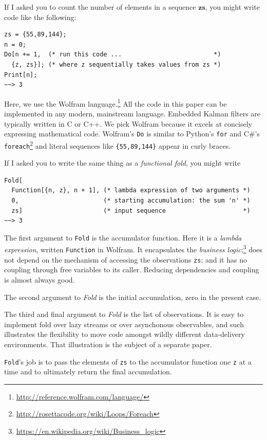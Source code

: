 \documentclass[10pt,oneside,x11names]{article}
\begin{document}
If I asked you to count the number of elements in a sequence
\(\mathbold{zs}\), you might write code like the following:

\begin{verbatim}
zs = {55,89,144};
n = 0;
Do[n += 1,  (* run this code ...                         *)
  {z, zs}]; (* where z sequentially takes values from zs *)
Print[n];
~~> 3
\end{verbatim}

\noindent Here, we use the Wolfram language.\footnote{\url{http://reference.wolfram.com/language/}} All the code in this paper
can be implemented in any modern, mainstream language. Embedded
Kalman filters are typically written in C or C++. We pick
Wolfram because it excels at concisely expressing mathematical code. Wolfram's
\texttt{Do} is similar to Python's \texttt{for} and C\#'s \texttt{foreach}\footnote{\url{http://rosettacode.org/wiki/Loops/Foreach}} and literal
sequences like \texttt{\{55,89,144\}} appear in curly braces.

If I asked you to write the same thing as a \emph{functional fold},\footnotemark[2]{} you
might write

\begin{verbatim}
Fold[
  Function[{n, z}, n + 1], (* lambda expression of two arguments *)
  0,                       (* starting accumulation: the sum 'n' *)
  zs]                      (* input sequence                     *)
~~> 3
\end{verbatim}

The first argument to \texttt{Fold} is the accumulator function.  Here it is
a \emph{lambda expression}, written \texttt{Function} in Wolfram. It
encapsulates the \emph{business logic};\footnote{\url{https://en.wikipedia.org/wiki/Business_logic}} does not depend on the mechanism of
accessing the observations \texttt{zs}; and it has no coupling through free
variables to its caller. Reducing dependencies and coupling is almost always
good.

The second argument to \emph{Fold} is the initial accumulation, zero in the present
case. 

The third and final argument to \emph{Fold} is the list of observations.
It is easy to implement fold over lazy streams or over asynchonous observables, and
such illustrates the flexibility to move code amongst wildly different
data-delivery environments. That illustration is the subject of a separate paper.

\texttt{Fold}'s job is to pass the elements of \texttt{zs} to the
accumulator function one \texttt{z} at a time and to ultimately
return the final accumulation.
\end{document}
